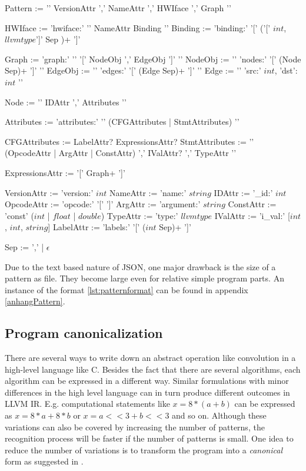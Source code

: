 \begin{formatdesc}[mathescape, caption={Pattern format description}, label={lst:patternformat}]

Pattern	:= '{' VersionAttr ',' NameAttr ',' HWIface ',' Graph '}'

HWIface	:= 'hwiface:' '{' NameAttr Binding '}'
Binding	:= 'binding:' '[' ('[' $int$, $llvmtype$']' Sep )+ ']'

Graph	:= 'graph:' '{' '[' NodeObj ',' EdgeObj ']' '}'
NodeObj	:= '{' 'nodes:' '[' (Node Sep)+ ']' '}'
EdgeObj	:= '{' 'edges:' '[' (Edge Sep)+ ']' '}'
Edge	:= '{' 'src:' $int$, 'dst': $int$ '}'

Node	:= '{' IDAttr ',' Attributes  '}'

Attributes	:= 'attributes:' '{' (CFGAttributes | StmtAttributes) '}'

CFGAttributes	:= LabelAttr? ExpressionsAttr?
StmtAttributes	:= 
				'{' (OpcodeAttr | ArgAttr | ConstAttr) ','
					IValAttr? ',' TypeAttr	'}'

ExpressionsAttr := '[' Graph+ ']'

VersionAttr	:= 'version:' $int$
NameAttr	:= 'name:' $string$
IDAttr		:= '_id:' $int$
OpcodeAttr	:= 'opcode:' '['  ']'
ArgAttr		:=  'argument:' $string$
ConstAttr	:=  'const' ($int$ | $float$ | $double$)
TypeAttr	:= 'type:' $llvmtype$
IValAttr	:= 'i_val:' [$int$, $int$, $string$]
LabelAttr	:= 'labels:' '[' ($int$ Sep)+ ']'

Sep := ',' | $\epsilon$
\end{formatdesc}

Due to the text based nature of JSON, one major drawback is the size of a pattern as file. They become large even for relative simple program parts. An instance of the format \ref{lst:patternformat} can be found in appendix \ref{anhangPattern}.

\subsection{Program canonicalization}
\label{sec:program caninicalization}


There are several ways to write down an abstract operation like convolution in a high-level language like C. Besides the fact that there are several algorithms, each algorithm can be expressed in a different way. Similar formulations with minor differences in the high level language can in turn produce different outcomes in LLVM IR. E.g. computational statements like $x = 8 * ( a + b )$ can be expressed as $x = 8*a + 8*b$ or $x = a << 3 + b << 3$ and so on. Although these variations can also be covered by increasing the number of patterns, the recognition process will be faster if the number of patterns is small. One idea to reduce the number of variations is to transform the program into a \textit{canonical} form as suggested in \cite{2000automatic}.

